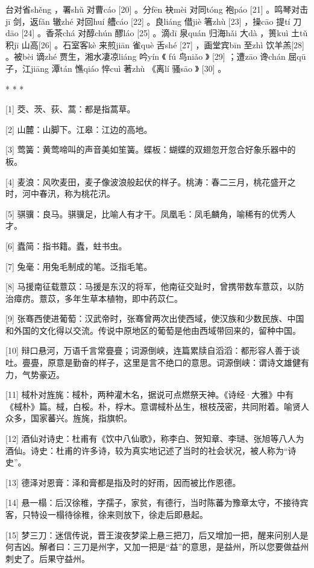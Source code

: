 \documentclass[12pt,UTF8]{ctexbook}
\begin{document}
台对省shěng ，署shǔ 对曹cáo [20] 。分fēn 袂mèi 对同tóng 袍páo [21] 。鸣琴对击jī 剑，返fǎn 辙zhé 对回huí 艚cáo [22] 。良liáng 借jiè 箸zhù [23] ，操cāo 提tí 刀dāo [24] 。香茶chá 对醇chún 醪láo [25] 。滴dī 泉quán 归海hǎi 大dà ，篑kuì 土tǔ 积jī 山高[26] 。石室客kè 来煎jiān 雀què 舌shé [27] ，画堂宾bīn 至zhì 饮羊羔[28] 。被bèi 谪zhé 贾生，湘水凄凉liáng 吟yín 《 fú 鸟niǎo 》 [29] ；遭zāo 谗chán 屈qū 子，江jiāng 潭tán 憔qiáo 悴cuì 著zhù 《离lí 骚sāo 》 [30] 。



* * *



[1] 茭、茨、荻、蒿：都是指蒿草。

[2] 山麓：山脚下。江皋：江边的高地。

[3] 莺簧：黄莺啼叫的声音美如笙簧。蝶板：蝴蝶的双翅忽开忽合好象乐器中的板。

[4] 麦浪：风吹麦田，麦子像波浪般起伏的样子。桃涛：春二三月，桃花盛开之时，河中春汛，称为桃花汛。

[5] 骐骥：良马。骐骥足，比喻人有才干。凤凰毛：凤毛麟角，喻稀有的优秀人才。

[6] 蠹简：指书籍。蠹，蛀书虫。

[7] 兔毫：用兔毛制成的笔。泛指毛笔。

[8] 马援南征载薏苡：马援是东汉的将军，他南征交趾时，曾携带数车薏苡，以防治瘴疠。薏苡，多年生草本植物，即中药苡仁。

[9] 张骞西使进葡萄：汉武帝时，张骞曾两次出使西域，使汉族和少数民族、中国和外国的文化得以交流。传说中原地区的葡萄是他由西域带回来的，留种中国。

[10] 辩口悬河，万语千言常亹亹；词源倒峡，连篇累牍自滔滔：都形容人善于谈吐。亹亹，原意是勤奋的样子，这里是言不绝口的意思。词源倒峡：谓诗文雄健有力，气势豪迈。

[11] 棫朴对旌旄：棫朴，两种灌木名，据说可点燃祭天神。《诗经·大雅》中有《棫朴》篇。棫，白桵。朴，桴木。意谓棫朴丛生，根枝茂密，共同附着。喻贤人众多，国家蕃兴。旌旄，指旗帜。

[12] 酒仙对诗史：杜甫有《饮中八仙歌》，称李白、贺知章、李琎、张旭等八人为酒仙。诗史：杜甫的许多诗，较为真实地记述了当时的社会状况，被人称为“诗史”。

[13] 德泽对恩膏：泽和膏都是指及时的好雨，因而被比作恩德。

[14] 悬一榻：后汉徐稚，字孺子，家贫，有德行，当时陈蕃为豫章太守，不接待宾客，只特设一榻待徐稚，徐来则放下，徐走后即悬起。

[15] 梦三刀：迷信传说，晋王浚夜梦梁上悬三把刀，后又增加一把，醒来问别人是何吉凶。解者曰：三刀是州字，又加一把是“益”的意思，是益州，所以您要做益州刺史了。后果守益州。
\end{document}
